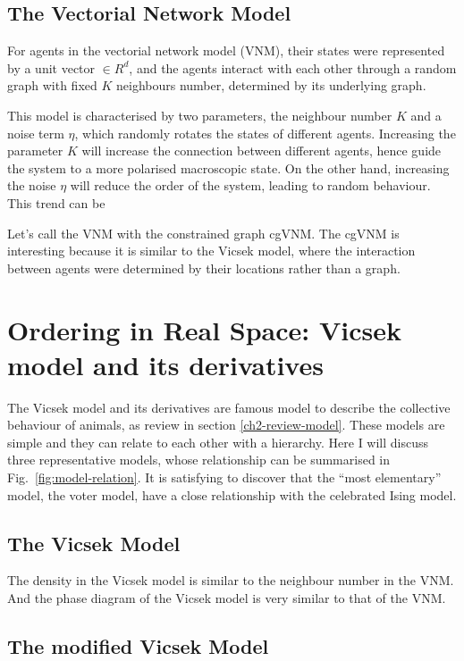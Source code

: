 \documentclass[11pt,twoside]{report}
\begin{document}
\subsection{The Vectorial Network Model}

For agents in the vectorial network model (VNM), their states were represented by a unit vector $\in R^d$, and the agents interact with each other through a random graph with fixed $K$ neighbours number, determined by its underlying graph.

This model is characterised by two parameters, the neighbour number $K$ and a noise term $\eta$, which randomly rotates the states of different agents. Increasing the parameter $K$ will increase the connection between different agents, hence guide the system to a more polarised macroscopic state. On the other hand, increasing the noise $\eta$ will reduce the order of the system, leading to random behaviour. This trend can be 


Let's call the VNM with the constrained graph cgVNM. The cgVNM is interesting because it is similar to the Vicsek model, where the interaction between agents were determined by their locations rather than a graph.


\section{Ordering in Real Space: Vicsek model and its derivatives}

The Vicsek model and its derivatives are famous model to describe the collective behaviour of animals, as review in section \ref{ch2-review-model}. These models are simple and they can relate to each other with a hierarchy. Here I will discuss three representative models, whose relationship can be summarised in Fig.\ \ref{fig:model-relation}. It is satisfying to discover that the ``most elementary'' model, the voter model, have a close relationship with the celebrated Ising model.


\subsection{The Vicsek Model}

The density in the Vicsek model is similar to the neighbour number in the VNM. And the phase diagram of the Vicsek model is very similar to that of the VNM.


\subsection{The modified Vicsek Model}
\end{document}

